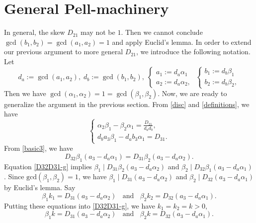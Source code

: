 \documentclass[12pt]{article}
\begin{document}
\section{General Pell-machinery}

In general, the skew $D_{21}$ may not be $1$. Then we cannot conclude $\gcd(b_1, b_2) = \gcd(a_1, a_2) = 1$ and apply Euclid's lemma. In order to extend our previous argument to more general $D_{21}$, we introduce the following notation. Let
\begin{equation} \label{definitions}
d_a := \gcd(a_1, a_2), \; d_b := \gcd(b_1, b_2), \; \left\{ \begin{array}{l}
a_1 := d_a \alpha_1 \\
a_2 := d_a \alpha_2,
\end{array} \right. \; 
\left\{ \begin{array}{l}
b_1 := d_b \beta_1 \\
b_2 := d_b \beta_2,
\end{array} \right.
\end{equation}
Then we have $\gcd(\alpha_1, \alpha_2) = 1 = \gcd(\beta_1, \beta_2)$. Now, we are ready to generalize the argument in the previous section. From \eqref{disc} and \eqref{definitions}, we have
\begin{equation} \label{start1k-g}
\left\{ \begin{array}{l} \alpha_2 \beta_1 - \beta_2 \alpha_1 = \frac{D_{21}}{d_a d_b}, \\
d_b a_3 \beta_1 - d_a b_3 \alpha_1 = D_{31}.
\end{array} \right.
\end{equation}
From \eqref{basic3}, we have
\begin{equation} \label{D32D31-g}
D_{32} \beta_1 (a_3 - d_a \alpha_1) = D_{31} \beta_2 (a_3 - d_a \alpha_2).
\end{equation}
Equation \eqref{D32D31-g} implies $\beta_1 \mid D_{31} \beta_2 (a_3 - d_a \alpha_2)$ and $\beta_2 \mid D_{32} \beta_1 (a_3 - d_a \alpha_1)$. Since $\text{gcd}(\beta_1, \beta_2) = 1$, we have $\beta_1 \mid D_{31} (a_3 - d_a \alpha_2)$ and $\beta_2 \mid D_{32} (a_3 - d_a \alpha_1)$ by Euclid's lemma. Say
\[
\beta_1 k_1 = D_{31} (a_3 - d_a \alpha_2) \; \; \text{ and } \; \; \beta_2 k_2 = D_{32} (a_3 - d_a \alpha_1).
\]
Putting these equations into \eqref{D32D31-g}, we have $k_1 = k_2 = k > 0$,
\begin{equation} \label{k-eq-g}
\beta_1 k = D_{31} (a_3 - d_a \alpha_2) \; \; \text{ and } \; \; \beta_2 k = D_{32} (a_3 - d_a \alpha_1).
\end{equation}
\end{document}

